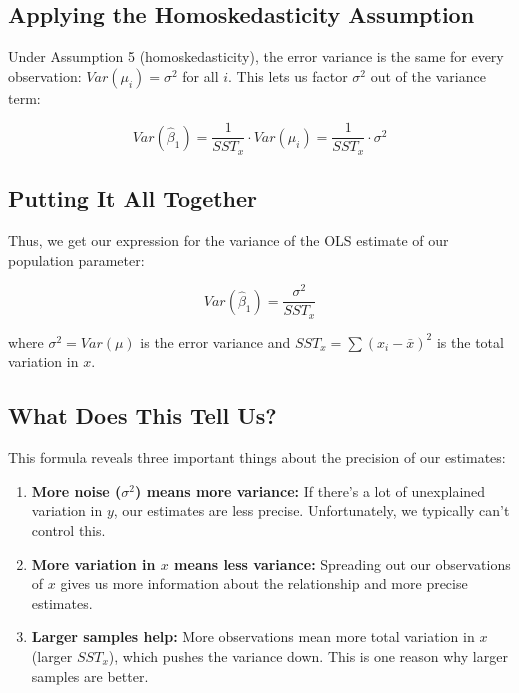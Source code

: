 \documentclass[
  letterpaper,
  DIV=11,
  numbers=noendperiod]{scrreprt}
\begin{document}
\subsection{Applying the Homoskedasticity
Assumption}\label{applying-the-homoskedasticity-assumption}

Under Assumption 5 (homoskedasticity), the error variance is the same
for every observation: \(Var(\mu_i) = \sigma^2\) for all \(i\). This
lets us factor \(\sigma^2\) out of the variance term:

\[
Var(\hat{\beta}_1) = \frac{1}{SST_x} \cdot Var(\mu_i) = \frac{1}{SST_x} \cdot \sigma^2
\]

\subsection{Putting It All Together}\label{putting-it-all-together}

Thus, we get our expression for the variance of the OLS estimate of our
population parameter:

\[
Var(\hat{\beta}_1) = \frac{\sigma^2}{SST_x}
\]

where \(\sigma^2 = Var(\mu)\) is the error variance and
\(SST_x = \sum(x_i - \bar{x})^2\) is the total variation in \(x\).

\subsection{What Does This Tell Us?}\label{what-does-this-tell-us}

This formula reveals three important things about the precision of our
estimates:

\begin{enumerate}
\def\labelenumi{\arabic{enumi}.}
\item
  \textbf{More noise (\(\sigma^2\)) means more variance:} If there's a
  lot of unexplained variation in \(y\), our estimates are less precise.
  Unfortunately, we typically can't control this.
\item
  \textbf{More variation in \(x\) means less variance:} Spreading out
  our observations of \(x\) gives us more information about the
  relationship and more precise estimates.
\item
  \textbf{Larger samples help:} More observations mean more total
  variation in \(x\) (larger \(SST_x\)), which pushes the variance down.
  This is one reason why larger samples are better.
\end{enumerate}
\end{document}
